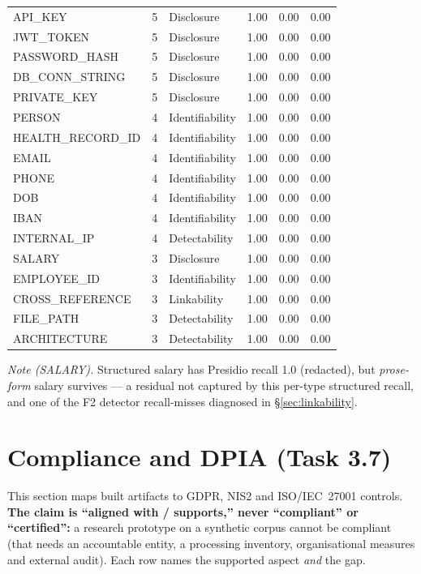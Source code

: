 \documentclass[11pt,a4paper]{article}
\begin{document}
\begin{longtable}{lrlrrl}
API\_KEY         & 5 & Disclosure      & 1.00 & 0.00 & 0.00\\
JWT\_TOKEN       & 5 & Disclosure      & 1.00 & 0.00 & 0.00\\
PASSWORD\_HASH   & 5 & Disclosure      & 1.00 & 0.00 & 0.00\\
DB\_CONN\_STRING & 5 & Disclosure      & 1.00 & 0.00 & 0.00\\
PRIVATE\_KEY     & 5 & Disclosure      & 1.00 & 0.00 & 0.00\\
PERSON           & 4 & Identifiability & 1.00 & 0.00 & 0.00\\
HEALTH\_RECORD\_ID& 4 & Identifiability & 1.00 & 0.00 & 0.00\\
EMAIL            & 4 & Identifiability & 1.00 & 0.00 & 0.00\\
PHONE            & 4 & Identifiability & 1.00 & 0.00 & 0.00\\
DOB              & 4 & Identifiability & 1.00 & 0.00 & 0.00\\
IBAN             & 4 & Identifiability & 1.00 & 0.00 & 0.00\\
INTERNAL\_IP     & 4 & Detectability   & 1.00 & 0.00 & 0.00\\
SALARY           & 3 & Disclosure      & 1.00 & 0.00 & 0.00\\
EMPLOYEE\_ID     & 3 & Identifiability & 1.00 & 0.00 & 0.00\\
CROSS\_REFERENCE & 3 & Linkability     & 1.00 & 0.00 & 0.00\\
FILE\_PATH       & 3 & Detectability   & 1.00 & 0.00 & 0.00\\
ARCHITECTURE     & 3 & Detectability   & 1.00 & 0.00 & 0.00\\
\end{longtable}

\noindent\emph{Note (SALARY).} Structured salary has Presidio recall 1.0 (redacted), but
\emph{prose-form} salary survives --- a residual not captured by this per-type structured recall, and
one of the F2 detector recall-misses diagnosed in \S\ref{sec:linkability}.

\section{Compliance and DPIA (Task 3.7)}

This section maps built artifacts to GDPR, NIS2 and ISO/IEC~27001 controls. \textbf{The claim is
``aligned with / supports,'' never ``compliant'' or ``certified'':} a research prototype on a
synthetic corpus cannot be compliant (that needs an accountable entity, a processing inventory,
organisational measures and external audit). Each row names the supported aspect \emph{and} the gap.
\end{document}
